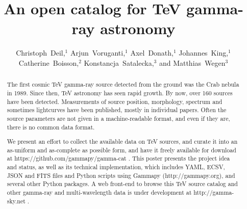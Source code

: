 \documentclass[11pt,twoside]{article}
\begin{document}
\title{An open catalog for TeV gamma-ray astronomy}

\author{Christoph~Deil,$^1$
Arjun~Voruganti,$^1$
Axel~Donath,$^1$
Johannes~King,$^1$
Catherine~Boisson,$^2$
Konstancja~Satalecka,$^3$
and Matthias~Wegen$^3$
}


\begin{abstract}

The first cosmic TeV gamma-ray source detected from the ground was the Crab
nebula in 1989. Since then, TeV astronomy has seen rapid growth. By now, over
160 sources have been detected. Measurements of source position, morphology,
spectrum and sometimes lightcurves have been published, mostly in individual
papers. Often the source parameters are not given in a machine-readable format,
and even if they are, there is no common data format.

We present an effort to collect the available data on TeV sources, and curate it
into an as-uniform and as-complete as possible form, and have it freely
available for download at https://github.com/gammapy/gamma-cat . This poster
presents the project idea and status, as well as its technical implementation,
which includes YAML, ECSV, JSON and FITS files and Python scripts using Gammapy
(http://gammapy.org), and several other Python packages. A web front-end to
browse this TeV source catalog and other gamma-ray and multi-wavelength data is
under development at http://gamma-sky.net .

\end{abstract}
\end{document}
